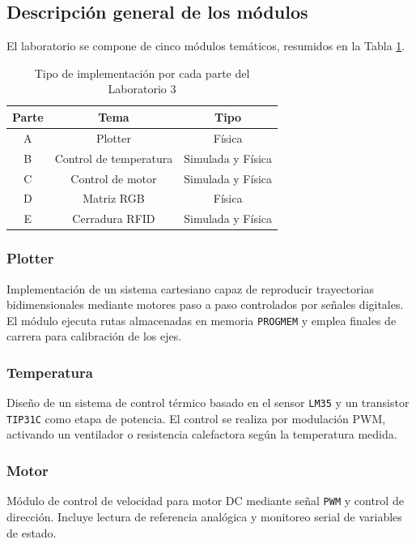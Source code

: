 \subsection{Descripción general de los módulos}

El laboratorio se compone de cinco módulos temáticos, resumidos en la Tabla \ref{tab:implementacion_lab3}.

\begin{table}[H]
\centering
\caption{Tipo de implementación por cada parte del Laboratorio 3}
\begin{tabular}{@{}ccc@{}}
\toprule
\textbf{Parte} & \textbf{Tema} & \textbf{Tipo} \\ \midrule
A & Plotter & Física \\
B & Control de temperatura & Simulada y Física \\
C & Control de motor & Simulada y Física \\
D & Matriz RGB & Física \\
E & Cerradura RFID & Simulada y Física \\ \bottomrule
\end{tabular}
\label{tab:implementacion_lab3}
\end{table}

\vspace{1em}

\subsubsection{Plotter}
Implementación de un sistema cartesiano capaz de reproducir trayectorias bidimensionales mediante motores paso a paso controlados por señales digitales. El módulo ejecuta rutas almacenadas en memoria \texttt{PROGMEM} y emplea finales de carrera para calibración de los ejes.

\vspace{1em}

\subsubsection{Temperatura}
Diseño de un sistema de control térmico basado en el sensor \texttt{LM35} y un transistor \texttt{TIP31C} como etapa de potencia. El control se realiza por modulación PWM, activando un ventilador o resistencia calefactora según la temperatura medida.

\vspace{1em}

\subsubsection{Motor}
Módulo de control de velocidad para motor DC mediante señal \texttt{PWM} y control de dirección. Incluye lectura de referencia analógica y monitoreo serial de variables de estado.

